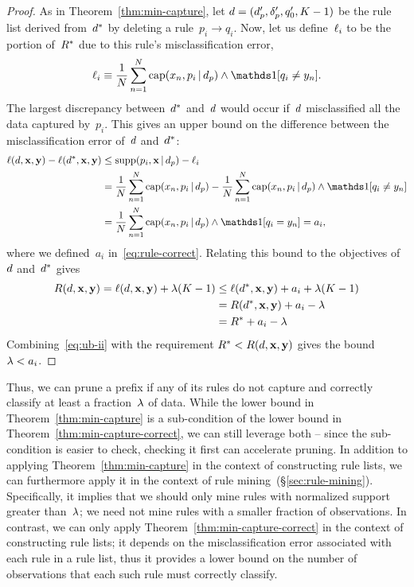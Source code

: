 \begin{proof}
As in Theorem~\ref{thm:min-capture},
let ${{d} =  (d_p', \delta_p', q_0', K-1)}$ be the rule list
derived from~$d^*$ by deleting a rule~${p_i \rightarrow q_i}$.
%
Now, let us define~$\ell_i$ to be the portion of~$R^*$
due to this rule's misclassification error,
\begin{align}
\Loss_i \equiv \frac{1}{N} \sum_{n=1}^N
  \Cap(x_n, p_i \given \Prefix) \wedge \one [ q_i \neq y_n ].
\end{align}
The largest discrepancy between~$d^*$ and~${d}$ would
occur if~${d}$ misclassified all the data captured by~$p_i$.
%
This gives an upper bound on the difference between
the misclassification error of~${d}$ and~$d^*$:
\begin{align}
\Loss(\RL, \x, \y) - \Loss(\OptimalRL, \x, \y)
&\le \Supp(p_i, \x \given \Prefix) - \Loss_i \nn \\
&= \frac{1}{N} \sum_{n=1}^N \Cap(x_n, p_i \given \Prefix)
  - \frac{1}{N} \sum_{n=1}^N
  \Cap(x_n, p_i \given \Prefix) \wedge \one [ q_i \neq y_n ] \nn \\
&= \frac{1}{N} \sum_{n=1}^N
  \Cap(x_n, p_i \given \Prefix) \wedge \one [ q_i = y_n ] = a_i,
\end{align}
where we defined~$a_i$ in~\eqref{eq:rule-correct}.
%
Relating this bound to the objectives of~${d}$ and~$d^*$ gives
\begin{align}
\Obj(\RL, \x, \y) = \Loss(\RL, \x, \y) + \Reg (K - 1)
&\le \Loss(\OptimalRL, \x, \y) + a_i + \Reg(K - 1) \nn \\
&= \Obj(\OptimalRL, \x, \y) + a_i - \Reg \nn \\
&= \OptimalObj + a_i - \Reg
\label{eq:ub-ii}
\end{align}
Combining~\eqref{eq:ub-ii} with the requirement
${R^* < R({d}, \mathbf{x}, \mathbf{y})}$ gives the bound~${{\lambda} < a_i}$.
\end{proof}

Thus, we can prune a prefix if any of its rules do not capture
and correctly classify at least a fraction~${\lambda}$ of data.
%
While the lower bound in Theorem~\ref{thm:min-capture} is a sub-condition
of the lower bound in Theorem~\ref{thm:min-capture-correct},
we can still leverage both -- since the sub-condition is easier to check,
checking it first can accelerate pruning.
%
In addition to applying Theorem~\ref{thm:min-capture} in the context of
constructing rule lists, we can furthermore apply it in the context of
rule mining~(\S\ref{sec:rule-mining}).
%
Specifically, it implies that we should only mine rules with
normalized support greater than~${\lambda}$;
we need not mine rules with a smaller fraction of observations.
%
In contrast, we can only apply Theorem~\ref{thm:min-capture-correct}
in the context of constructing rule lists;
it depends on the misclassification error associated with each
rule in a rule list, thus it provides a lower bound on the number of
observations that each such rule must correctly classify.

